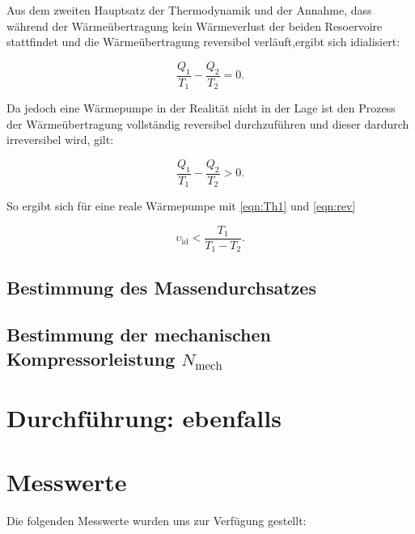         Aus dem zweiten Hauptsatz der Thermodynamik und der Annahme, dass während der Wärmeübertragung kein Wärmeverlust der beiden Resoervoire stattfindet
         und die Wärmeübertragung reversibel verläuft,ergibt sich idialisiert:

        \begin{equation}
            \frac{Q_1}{T_1} - \frac{Q_2}{T_2} = 0.
            \label{eqn:irev}
        \end{equation}
        
        Da jedoch eine Wärmepumpe in der Realität nicht in der Lage ist den Prozess der Wärmeübertragung vollständig reversibel durchzuführen und dieser dardurch irreversibel wird, gilt:

        \begin{equation}
            \frac{Q_1}{T_1} - \frac{Q_2}{T_2} > 0.
            \label{eqn:rev}
        \end{equation}

        So ergibt sich für eine reale Wärmepumpe mit \ref{eqn:Th1} und \ref{eqn:rev}

        \begin{equation}
            \upsilon_\text{id} < \frac{T_1}{T_1 - T_2}.
            \label{eqn:Gueteziffer_real}
        \end{equation}

        




        \subsection{Bestimmung des Massendurchsatzes}

        \subsection{Bestimmung der mechanischen Kompressorleistung $N_\text{mech}$}

    \newpage
    \section{Durchführung: ebenfalls}

    \newpage
    \section{Messwerte}
    Die folgenden Messwerte wurden uns zur Verfügung gestellt:
    


